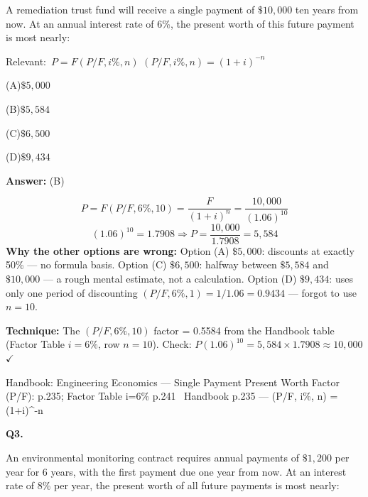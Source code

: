 \documentclass[11pt]{article}
\newcommand{\correct}[1]{\textbf{#1}\;{\color{accent}$\checkmark$}}
\newcommand{\optline}[2]{\par\noindent\hspace{1.2em}(#1)\hspace{0.6em}#2}
\begin{document}
A remediation trust fund will receive a single payment of $\$10{,}000$ ten years from now. At an annual interest rate of 6\%, the present worth of this future payment is most nearly:\par\par\vspace{3pt}
{\small\color{soft}Relevant:}\ $P = F(P/F, i\%, n)$ \quad $(P/F, i\%, n) = (1 + i)^{-n}$\par\vspace{3pt}
\optline{A}{$\$5{,}000$}
\optline{B}{\correct{$\$5{,}584$}}
\optline{C}{$\$6{,}500$}
\optline{D}{$\$9{,}434$}
\par\vspace{3pt}
\vspace{2pt}\par\noindent\colorbox{boxbg}{\parbox{\dimexpr\linewidth-2\fboxsep\relax}{%
\vspace{2pt}\textbf{Answer:} (B)\par\vspace{2pt}
{\small \[P = F(P/F, 6\%, 10) = \frac{F}{(1+i)^n} = \frac{10{,}000}{(1.06)^{10}}\]
\[(1.06)^{10} = 1.7908 \Rightarrow P = \frac{10{,}000}{1.7908} = 5{,}584\]
\textbf{Why the other options are wrong:} Option (A) $\$5{,}000$: discounts at exactly 50\% --- no formula basis. Option (C) $\$6{,}500$: halfway between $\$5{,}584$ and $\$10{,}000$ --- a rough mental estimate, not a calculation. Option (D) $\$9{,}434$: uses only one period of discounting $(P/F, 6\%, 1) = 1/1.06 = 0.9434$ --- forgot to use $n = 10$.\par
\textbf{Technique:} The $(P/F, 6\%, 10)$ factor = 0.5584 from the Handbook table (Factor Table $i = 6\%$, row $n = 10$). Check: $P(1.06)^{10} = 5{,}584 \times 1.7908 \approx 10{,}000$ $\checkmark$\par}\par\vspace{2pt}
{\footnotesize\color{soft}Handbook: Engineering Economics --- Single Payment Present Worth Factor (P/F): p.235; Factor Table i=6\% p.241 \textbullet\ Handbook p.235 --- (P/F, i\%, n) = (1+i)\textasciicircum{}-n}\vspace{2pt}
}}
\vspace{9pt}
\filbreak
\textbf{\color{accent}Q3.}\par\vspace{2pt}
An environmental monitoring contract requires annual payments of $\$1{,}200$ per year for 6 years, with the first payment due one year from now. At an interest rate of 8\% per year, the present worth of all future payments is most nearly:\par\par\vspace{3pt}
\end{document}
